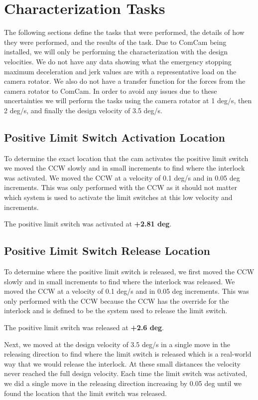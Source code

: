 \documentclass[SE,authoryear,toc]{lsstdoc}
\begin{document}
\section{Characterization Tasks}\label{sec:Characterization Tasks}

The following sections define the tasks that were performed, the details of how they were performed, and the results of the task. Due to ComCam being installed, we will only be performing the characterization with the design velocities. We do not have any data showing what the emergency stopping maximum deceleration and jerk values are with a representative load on the camera rotator. We also do not have a transfer function for the forces from the camera rotator to ComCam. In order to avoid any issues due to these uncertainties we will perform the tasks using the camera rotator at 1 deg/s, then 2 deg/s, and finally the design velocity of 3.5 deg/s.

\subsection{Positive Limit Switch Activation Location}

To determine the exact location that the cam activates the positive
limit switch we moved the CCW slowly and in small increments to find
where the interlock was activated. We moved the CCW at a velocity of 0.1
deg/s and in 0.05 deg increments. This was only performed with the CCW
as it should not matter which system is used to activate the limit
switches at this low velocity and increments.

The positive limit switch was activated at \textbf{+2.81 deg}.

\subsection{Positive Limit Switch Release Location}

To determine where the positive limit switch is released, we first moved
the CCW slowly and in small increments to find where the interlock was
released. We moved the CCW at a velocity of 0.1 deg/s and in 0.05 deg
increments. This was only performed with the CCW because the CCW has the
override for the interlock and is defined to be the system used to
release the limit switch.

The positive limit switch was released at \textbf{+2.6 deg}.

Next, we moved at the design velocity of 3.5 deg/s in a single move in
the releasing direction to find where the limit switch is released which
is a real-world way that we would release the interlock. At these small
distances the velocity never reached the full design velocity. Each time
the limit switch was activated, we did a single move in the releasing
direction increasing by 0.05 deg until we found the location that the
limit switch was released.
\end{document}

